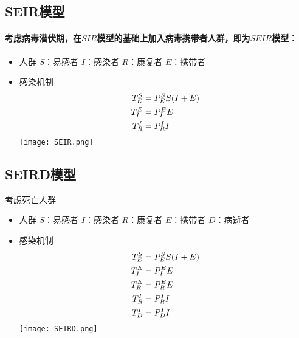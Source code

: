 \subsection{SEIR模型}
\paragraph{考虑病毒潜伏期，在$SIR$模型的基础上加入病毒携带者人群，即为$SEIR$模型：}
\begin{itemize}
	\item 人群
	      \subitem $S$：易感者
	      \subitem $I$：感染者
	      \subitem $R$：康复者
	      \subitem $E$：携带者
	\item 感染机制
	      \subitem
	      \begin{align}
		      T^{S}_{E}&=P^{S}_{E}S(I+E) \\
		      T^{E}_{I}&=P^{E}_{I}E      \\
		      T^{I}_{R}&=P^{I}_{R}I
	      \end{align}
	      \texttt{[image: SEIR.png]}
\end{itemize}
\subsection{SEIRD模型}
考虑死亡人群
\begin{itemize}
	\item 人群
	      \subitem $S$：易感者
	      \subitem $I$：感染者
	      \subitem $R$：康复者
	      \subitem $E$：携带者
	      \subitem $D$：病逝者
	\item 感染机制
	      \subitem
	      \begin{align}
		      T^{S}_{E}&=P^{S}_{E}S(I+E) \\
		      T^{E}_{I}&=P^{E}_{I}E      \\
		      T^{E}_{R}&=P^{E}_{R}E      \\
		      T^{I}_{R}&=P^{I}_{R}I      \\
		      T^{I}_{D}&=P^{I}_{D}I
	      \end{align}
	      \texttt{[image: SEIRD.png]}
\end{itemize}